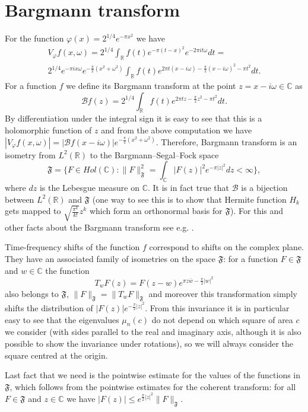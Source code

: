 \documentclass[12pt]{amsart}
\numberwithin{equation}{section}
\newcommand{\R}{\mathbb{R}}
\newcommand{\Cm}{\mathbb{C}}
\newcommand{\Fo}{\mathfrak{F}}
\newcommand{\B}{\mathcal{B}}
\renewcommand{\phi}{\varphi}
\begin{document}
\section{Bargmann transform}
For the function $\phi(x) = 2^{1/4}e^{-\pi x^2}$ we have
\begin{align*}
V_\phi f(x, \omega) = 2^{1/4}\int_\R f(t)e^{-\pi (t-x)^2} e^{- 2\pi i t \omega}dt=\\
2^{1/4}e^{-\pi i x\omega} e^{-\frac{\pi}{2}(x^2+\omega^2)}\int_\R f(t)e^{2\pi t(x-i\omega)-\frac{\pi}{2}(x-i\omega)^2-\pi t^2}dt.
\end{align*}
For a function $f$ we define its Bargmann transform at the point $z = x-i\omega\in \Cm$ as 
$$\B f(z) = 2^{1/4}\int_\R f(t) e^{2\pi t z - \frac{\pi}{2}z^2 - \pi t^2}dt.$$
By differentiation under the integral sign it is easy to see that this is a holomorphic function of $z$ and from the above computation we have $|V_\phi f(x, \omega)| = |\B f(x-i\omega)|e^{-\frac{\pi}{2}(x^2+\omega^2)}$. Therefore, Bargmann transform is an isometry from $L^2(\R)$ to the Bargmann--Segal--Fock space
$$\Fo = \{ F\in Hol(\Cm): \|F\|^2_{\Fo} = \int_\Cm |F(z)|^2e^{-\pi |z|^2}dz < \infty\},$$
where $dz$ is the Lebesgue measure on $\Cm$. It is in fact true that $\B$ is a bijection between $L^2(\R)$ and $\Fo$ (one way to see this is to show that Hermite function $H_k$ gets mapped to $\sqrt{\frac{\pi^k}{k!}}z^k$ which form an orthonormal basis for $\Fo$). For this and other facts about the Bargmann transform see e.g. \cite[Section 3.4]{Gro}.

Time-frequency shifts of the function $f$ correspond to shifts on the complex plane. They have an associated family of isometries on the space $\Fo$: for a function $F\in \Fo$ and $w\in \Cm$ the function
$$T_w F(z) = F(z-w)e^{\pi z\bar{w} - \frac{\pi}{2}|w|^2}$$
also belongs to $\Fo$, $\|F\|_\Fo = \|T_w F\|_\Fo$ and moreover this transformation simply shifts the distribution of $|F(z)|e^{-\frac{\pi}{2}|z|^2}$. From this invariance it is in particular easy to see that the eigenvalues $\mu_n(c)$ do not depend on which square of area $c$  we consider (with sides parallel to the real and imaginary axis, although it is also possible to show the invariance under rotations), so we will always consider the square centred at the origin.

Last fact that we need is the pointwise estimate for the values of the functions in $\Fo$, which follows from the pointwise estimates for the coherent transform: for all $F\in \Fo$ and $z\in\Cm$ we have $|F(z)|\le e^{\frac{\pi}{2}|z|^2}\|F\|_{\Fo}$.
\end{document}
